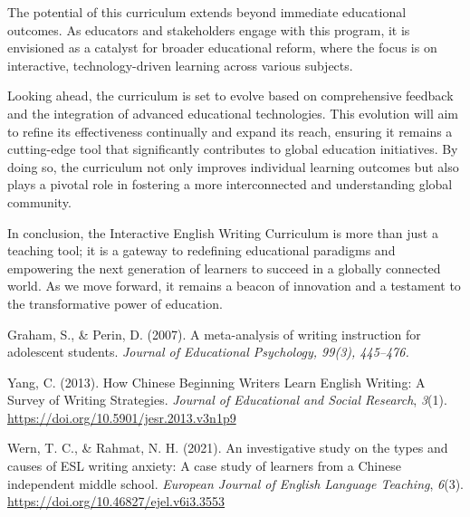 \documentclass[11pt]{article}
\begin{document}
The potential of this curriculum extends beyond immediate educational outcomes. As educators and stakeholders engage with this program, it is envisioned as a catalyst for broader educational reform, where the focus is on interactive, technology-driven learning across various subjects.

Looking ahead, the curriculum is set to evolve based on comprehensive feedback and the integration of advanced educational technologies. This evolution will aim to refine its effectiveness continually and expand its reach, ensuring it remains a cutting-edge tool that significantly contributes to global education initiatives. By doing so, the curriculum not only improves individual learning outcomes but also plays a pivotal role in fostering a more interconnected and understanding global community.

In conclusion, the Interactive English Writing Curriculum is more than just a teaching tool; it is a gateway to redefining educational paradigms and empowering the next generation of learners to succeed in a globally connected world. As we move forward, it remains a beacon of innovation and a testament to the transformative power of education.

\begin{references}
\item Graham, S., \& Perin, D. (2007). A meta-analysis of writing instruction for adolescent students. \textit{Journal of Educational Psychology, 99(3), 445–476.}
\item Yang, C. (2013). How Chinese Beginning Writers Learn English Writing: A Survey of Writing Strategies. \textit{Journal of Educational and Social Research}, \textit{3}(1). \url{https://doi.org/10.5901/jesr.2013.v3n1p9}
\item Wern, T. C., \& Rahmat, N. H. (2021). An investigative study on the types and causes of ESL writing anxiety: A case study of learners from a Chinese independent middle school. \textit{European Journal of English Language Teaching}, \textit{6}(3). \url{https://doi.org/10.46827/ejel.v6i3.3553}
\end{references}
\end{document}
